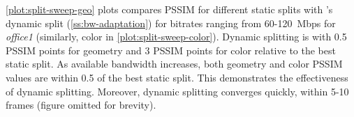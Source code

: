 %
%
%
%
%
%
\cref{plot:split-sweep-geo} plots compares PSSIM for different static splits with \livo{}'s dynamic split (\cref{ss:bw-adaptation}) for bitrates ranging from 60-120~Mbps for \textit{office1} (similarly, color in \cref{plot:split-sweep-color}).
%
Dynamic splitting is with 0.5 PSSIM points for geometry and 3 PSSIM points for color relative to the best static split.
%
As available bandwidth increases, both geometry and color PSSIM values are within 0.5 of the best static split.
%
This demonstrates the effectiveness of dynamic splitting.
%
%
Moreover, dynamic splitting converges quickly, within 5-10 frames (figure omitted for brevity).
%
%

